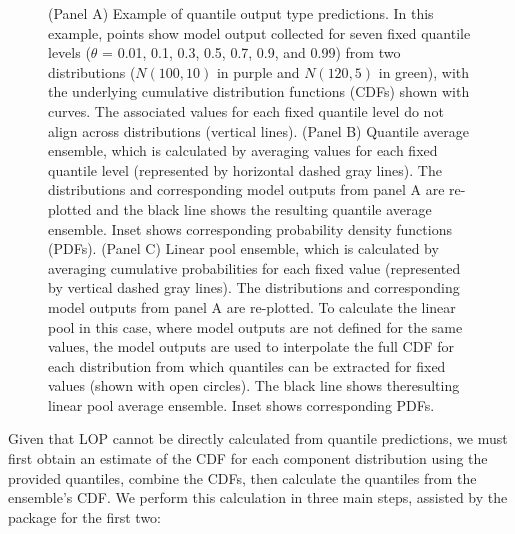 \documentclass[
  article,
  shortnames,
  notitle]{jss}
\begin{document}
\begin{figure}


\caption{\label{fig-example-quantile-average-and-linear-pool}(Panel A)
Example of quantile output type predictions. In this example, points
show model output collected for seven fixed quantile levels (\(\theta\)
= 0.01, 0.1, 0.3, 0.5, 0.7, 0.9, and 0.99) from two distributions
(\(N(100, 10)\) in purple and \(N(120, 5)\) in green), with the
underlying cumulative distribution functions (CDFs) shown with curves.
The associated values for each fixed quantile level do not align across
distributions (vertical lines). (Panel B) Quantile average ensemble,
which is calculated by averaging values for each fixed quantile level
(represented by horizontal dashed gray lines). The distributions and
corresponding model outputs from panel A are re-plotted and the black
line shows the resulting quantile average ensemble. Inset shows
corresponding probability density functions (PDFs). (Panel C) Linear
pool ensemble, which is calculated by averaging cumulative probabilities
for each fixed value (represented by vertical dashed gray lines). The
distributions and corresponding model outputs from panel A are
re-plotted. To calculate the linear pool in this case, where model
outputs are not defined for the same values, the model outputs are used
to interpolate the full CDF for each distribution from which quantiles
can be extracted for fixed values (shown with open circles). The black
line shows theresulting linear pool average ensemble. Inset shows
corresponding PDFs.}

\end{figure}%

Given that LOP cannot be directly calculated from quantile predictions,
we must first obtain an estimate of the CDF for each component
distribution using the provided quantiles, combine the CDFs, then
calculate the quantiles from the ensemble's CDF. We perform this
calculation in three main steps, assisted by the  package
\citep{distfromq} for the first two:
\end{document}
